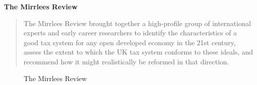 \begin{frame}
	\textbf{The Mirrlees Review} \\ \vspace{15pt}
	\begin{quote}
		The Mirrlees Review brought together a high-profile group of
		international experts and early career researchers to identify the
		characteristics of a good tax system for any open developed economy in
		the 21st century, assess the extent to which the UK tax system conforms
		to these ideals, and recommend how it might realistically be reformed in
		that direction.
	\end{quote}
\end{frame}
\begin{frame}
	\begin{figure}
		\caption{The Mirrlees Review}
		\centering
		 \hspace{25pt}
	\end{figure}
\end{frame}

